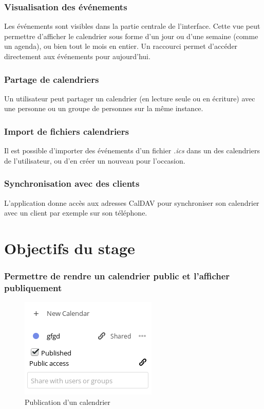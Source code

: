 \documentclass[10pt,a4paper, twoside]{report}
\begin{document}
	\subsubsection{Visualisation des événements}
	Les événements sont visibles dans la partie centrale de l'interface. Cette vue peut permettre d'afficher le calendrier sous forme d'un jour ou d'une semaine (comme un agenda), ou bien tout le mois en entier. Un raccourci permet d'accéder directement aux événements pour aujourd’hui.
	
	\subsubsection{Partage de calendriers}
	Un utilisateur peut partager un calendrier (en lecture seule ou en écriture) avec une personne ou un groupe de personnes sur la même instance.
	
	\subsubsection{Import de fichiers calendriers}
	Il est possible d'importer des événements d'un fichier \textit{.ics} dans un des calendriers de l'utilisateur, ou d'en créer un nouveau pour l'occasion.
	
	\subsubsection{Synchronisation avec des clients}
	L'application donne accès aux adresses CalDAV pour synchroniser son calendrier avec un client par exemple sur son téléphone.
	
	\section{Objectifs du stage}
	
	\subsubsection{Permettre de rendre un calendrier public et l'afficher publiquement}
	
	\begin{figure}
		\begin{center}
		\includegraphics[width=0.3\paperwidth]{images/fonctionnalitepublie.png}
	\end{center}
		\caption{Publication d'un calendrier}
	\end{figure}
	
\end{document}
